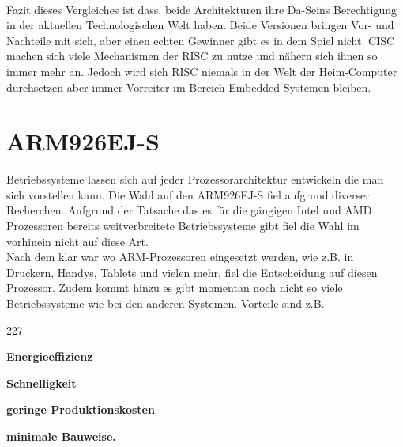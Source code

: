 \\
\noindent
Fazit dieses Vergleiches ist dass, beide Architekturen ihre Da-Seins Berechtigung in der aktuellen Technologischen Welt haben. Beide Versionen bringen Vor- und Nachteile mit sich, aber einen echten Gewinner gibt es in dem Spiel nicht. CISC machen sich viele Mechanismen der RISC zu nutze und n\"ahern sich ihnen so immer mehr an. Jedoch wird sich RISC niemals in der Welt der Heim-Computer durchsetzen aber immer Vorreiter im Bereich Embedded Systemen bleiben.
\section{ARM926EJ-S}
Betriebssysteme lassen sich auf jeder Prozessorarchitektur entwickeln die man sich vorstellen kann. Die Wahl auf den ARM926EJ-S fiel aufgrund diverser Recherchen. Aufgrund der Tatsache das es f\"ur die g\"angigen Intel und AMD Prozessoren bereits weitverbreitete Betriebssysteme gibt fiel die Wahl im vorhinein nicht auf diese Art.\\
Nach dem klar war wo ARM-Prozessoren eingesetzt werden, wie z.B. in Druckern, Handys, Tablets und vielen mehr, fiel die Entscheidung auf diesen Prozessor. Zudem kommt hinzu es gibt momentan noch nicht so viele Betriebssysteme wie bei den anderen Systemen. Vorteile sind z.B.
\begin{dinglist}{227}
	\item{\textbf{Energieeffizienz}}
	\item{\textbf{Schnelligkeit}}
	\item{\textbf{geringe Produktionskosten}}
	\item{\textbf{minimale Bauweise.}}
\end{dinglist}
